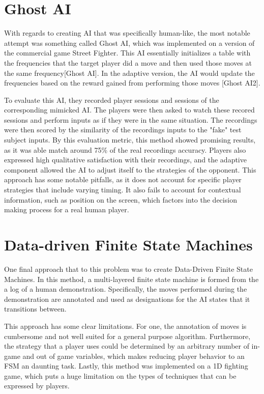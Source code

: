 \section{Ghost AI}
With regards to creating AI that was specifically human-like, the most notable attempt was something called Ghost AI, which was implemented on a version of the commercial game Street Fighter. This AI essentially initializes a table with the frequencies that the target player did a move and then used those moves at the same frequency[Ghost AI]. In the adaptive version, the AI would update the frequencies based on the reward gained from performing those moves [Ghost AI2]. 

To evaluate this AI, they recorded player sessions and sessions of the corresponding mimicked AI. The players were then asked to watch these recored sessions and perform inputs as if they were in the same situation. The recordings were then scored by the similarity of the recordings inputs to the "fake" test subject inputs. By this evaluation metric, this method showed promising results, as it was able match around 75\% of the real recordings accuracy. Players also expressed high qualitative satisfaction with their recordings, and the adaptive component allowed the AI to adjust itself to the strategies of the opponent. This approach has some notable pitfalls, as it does not account for specific player strategies that include varying timing. It also fails to account for contextual information, such as position on the screen, which factors into the decision making process for a real human player. 

\section{Data-driven Finite State Machines}
One final approach that to this problem was to create Data-Driven Finite State Machines. In this method, a multi-layered finite state machine is formed from the a log of a human demonstration. Specifically, the moves performed during the demonstration are annotated and used as designations for the AI states that it transitions between.

This approach has some clear limitations. For one, the annotation of moves is cumbersome and not well suited for a general purpose algorithm. Furthermore, the strategy that a player uses could be determined by an arbitrary number of in-game and out of game variables, which makes reducing player behavior to an FSM an daunting task. Lastly, this method was implemented on a 1D fighting game, which puts a huge limitation on the types of techniques that can be expressed by players.

